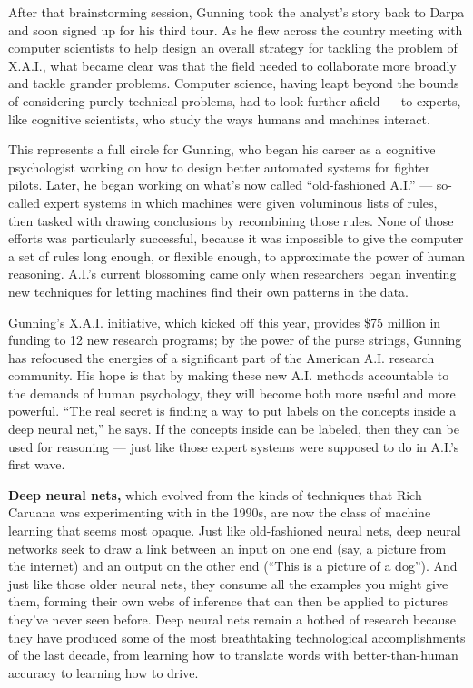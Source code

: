 After that brainstorming session, Gunning took the analyst's story back
to Darpa and soon signed up for his third tour. As he flew across the
country meeting with computer scientists to help design an overall
strategy for tackling the problem of X.A.I., what became clear was that
the field needed to collaborate more broadly and tackle grander
problems. Computer science, having leapt beyond the bounds of
considering purely technical problems, had to look further afield --- to
experts, like cognitive scientists, who study the ways humans and
machines interact.

This represents a full circle for Gunning, who began his career as a
cognitive psychologist working on how to design better automated systems
for fighter pilots. Later, he began working on what's now called
``old-fashioned A.I.'' --- so-called expert systems in which machines
were given voluminous lists of rules, then tasked with drawing
conclusions by recombining those rules. None of those efforts was
particularly successful, because it was impossible to give the computer
a set of rules long enough, or flexible enough, to approximate the power
of human reasoning. A.I.'s current blossoming came only when researchers
began inventing new techniques for letting machines find their own
patterns in the data.

Gunning's X.A.I. initiative, which kicked off this year, provides \$75
million in funding to 12 new research programs; by the power of the
purse strings, Gunning has refocused the energies of a significant part
of the American A.I. research community. His hope is that by making
these new A.I. methods accountable to the demands of human psychology,
they will become both more useful and more powerful. ``The real secret
is finding a way to put labels on the concepts inside a deep neural
net,'' he says. If the concepts inside can be labeled, then they can be
used for reasoning --- just like those expert systems were supposed to
do in A.I.'s first wave.

\textbf{Deep neural nets,} which evolved from the kinds of techniques
that Rich Caruana was experimenting with in the 1990s, are now the class
of machine learning that seems most opaque. Just like old-fashioned
neural nets, deep neural networks seek to draw a link between an input
on one end (say, a picture from the internet) and an output on the other
end (``This is a picture of a dog''). And just like those older neural
nets, they consume all the examples you might give them, forming their
own webs of inference that can then be applied to pictures they've never
seen before. Deep neural nets remain a hotbed of research because they
have produced some of the most breathtaking technological
accomplishments of the last decade, from learning how to translate words
with better-than-human accuracy to learning how to drive.


